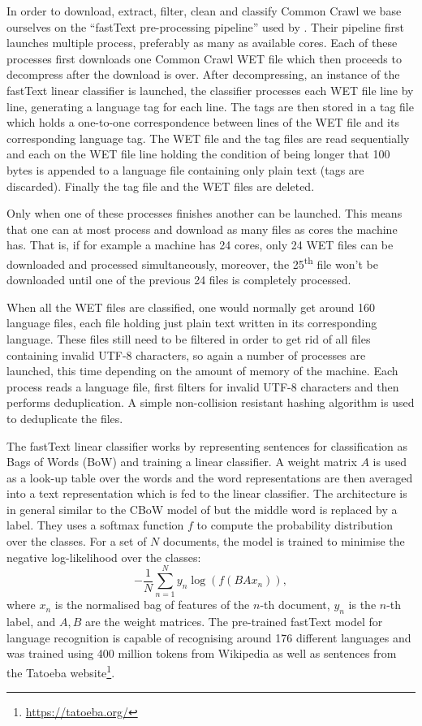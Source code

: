 In order to download, extract, filter, clean and classify Common Crawl we base ourselves on the ``fastText pre-processing pipeline'' used by \citet{grave-etal-2018-learning}. Their pipeline first launches multiple process, preferably as many as available cores. Each of these processes first downloads one Common Crawl WET file which then proceeds to decompress after the download is over. After decompressing, an instance of the fastText linear classifier \citep{joulin-etal-2016-fasttext, joulin-etal-2017-bag} is launched, the classifier processes each WET file line by line, generating a language tag for each line. The tags are then stored in a tag file which holds a one-to-one correspondence between lines of the WET file and its corresponding language tag. The WET file and the tag files are read sequentially and each on the WET file line holding the condition of being longer that 100 bytes is appended to a language file containing only plain text (tags are discarded). Finally the tag file and the WET files are deleted.

Only when one of these processes finishes another can be launched. This means that one can at most process and download as many files as cores the machine has. That is, if for example a machine has 24 cores, only 24 WET files can be downloaded and processed simultaneously, moreover, the 25\textsuperscript{th} file won't be downloaded until one of the previous 24 files is completely processed.

When all the WET files are classified, one would normally get around 160 language files, each file holding just plain text written in its corresponding language. These files still need to be filtered in order to get rid of all files containing invalid UTF-8 characters, so again a number of processes are launched, this time depending on the amount of memory of the machine. Each process reads a language file, first filters for invalid UTF-8 characters and then performs deduplication. A simple non-collision resistant hashing algorithm is used to deduplicate the files.

The fastText linear classifier works by representing sentences for classification as Bags of Words (BoW) and training a linear classifier. A weight matrix $A$ is used as a look-up table over the words and the word representations are then averaged into a text representation which is fed to the linear classifier. The architecture is in general similar to the CBoW model of \citet{mikolov-etal-2013-distributed} but the middle word is replaced by a label. They uses a softmax function $f$ to compute the probability distribution over the classes. For a set of $N$ documents, the model is trained to minimise the negative log-likelihood over the classes:
\[
    -\frac{1}{N}\sum_{n=1}^{N} y_n\log\left(f(BAx_n)\right),
\]
where $x_n$ is the normalised bag of features of the $n$-th document, $y_n$ is the $n$-th label, and $A,B$ are the weight matrices. The pre-trained fastText model for language recognition \citep{grave-etal-2018-learning} is capable of recognising around 176 different languages and was trained using 400 million tokens from Wikipedia as well as sentences from the Tatoeba website\footnote{\url{https://tatoeba.org/}}.
